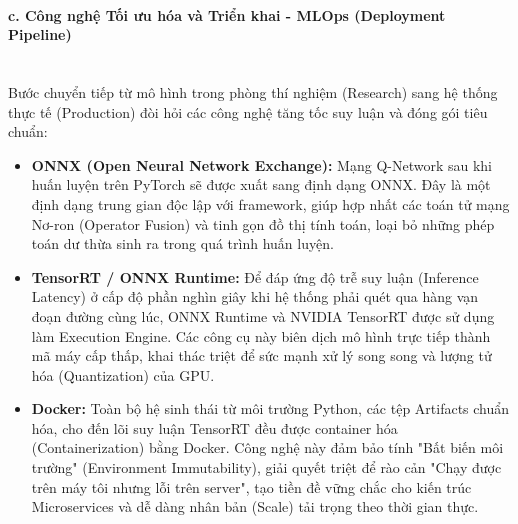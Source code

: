 \paragraph{c. Công nghệ Tối ưu hóa và Triển khai - MLOps (Deployment Pipeline)} \mbox{} \\
Bước chuyển tiếp từ mô hình trong phòng thí nghiệm (Research) sang hệ thống thực tế (Production) đòi hỏi các công nghệ tăng tốc suy luận và đóng gói tiêu chuẩn:
\begin{itemize}
    \item \textbf{ONNX (Open Neural Network Exchange):} Mạng Q-Network sau khi huấn luyện trên PyTorch sẽ được xuất sang định dạng ONNX. Đây là một định dạng trung gian độc lập với framework, giúp hợp nhất các toán tử mạng Nơ-ron (Operator Fusion) và tinh gọn đồ thị tính toán, loại bỏ những phép toán dư thừa sinh ra trong quá trình huấn luyện.
    \item \textbf{TensorRT / ONNX Runtime:} Để đáp ứng độ trễ suy luận (Inference Latency) ở cấp độ phần nghìn giây khi hệ thống phải quét qua hàng vạn đoạn đường cùng lúc, ONNX Runtime và NVIDIA TensorRT được sử dụng làm Execution Engine. Các công cụ này biên dịch mô hình trực tiếp thành mã máy cấp thấp, khai thác triệt để sức mạnh xử lý song song và lượng tử hóa (Quantization) của GPU.
    \item \textbf{Docker:} Toàn bộ hệ sinh thái từ môi trường Python, các tệp Artifacts chuẩn hóa, cho đến lõi suy luận TensorRT đều được container hóa (Containerization) bằng Docker. Công nghệ này đảm bảo tính "Bất biến môi trường" (Environment Immutability), giải quyết triệt để rào cản "Chạy được trên máy tôi nhưng lỗi trên server", tạo tiền đề vững chắc cho kiến trúc Microservices và dễ dàng nhân bản (Scale) tải trọng theo thời gian thực.
\end{itemize}
